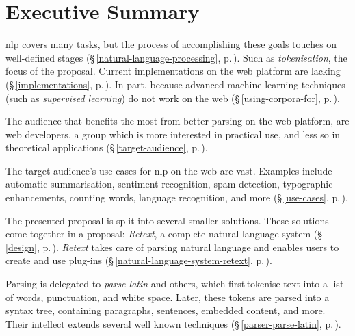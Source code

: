 
\begingroup
\let\clearpage\relax
\let\cleardoublepage\relax
\let\cleardoublepage\relax

\chapter*{Executive Summary}

\gls{nlp} covers many tasks, but the process of accomplishing
  these goals touches on well-defined stages
  (§\,\ref{natural-language-processing},
  p.\,\pageref{natural-language-processing}).
Such as \emph{tokenisation}, the focus of the proposal.
Current implementations on the web platform are lacking
  (§\,\ref{implementations}, p.\,\pageref{implementations}).
In part, because advanced machine learning techniques (such as
  \emph{supervised learning}) do not work on the web
  (§\,\ref{using-corpora-for}, p.\,\pageref{using-corpora-for}).

The audience that benefits the most from better parsing on the web platform,
  are web developers, a group which is more interested in practical use, and
  less so in theoretical applications
  (§\,\ref{target-audience}, p.\,\pageref{target-audience}).

The target audience's use cases for \gls{nlp} on the web are vast. Examples
  include automatic summarisation, sentiment recognition, spam detection,
  typographic enhancements, counting words, language recognition, and more
  (§\,\ref{use-cases}, p.\,\pageref{use-cases}).

The presented proposal is split into several smaller solutions.
These solutions come together in a proposal: \emph{Retext}, a complete
  natural language system (§\,\ref{design}, p.\,\pageref{design}).
\emph{Retext} takes care of parsing natural language and enables users to
  create and use plug-ins (§\,\ref{natural-language-system-retext},
  p.\,\pageref{natural-language-system-retext}).

Parsing is delegated to \emph{parse-latin} and others, which first\,tokenise
  text into a list of words, punctuation, and white space. Later, these
  tokens are parsed into a syntax tree, containing paragraphs, sentences,
  embedded content, and more. Their intellect extends several well known
  techniques (§\,\ref{parser-parse-latin}, p.\,\pageref{parser-parse-latin}).

